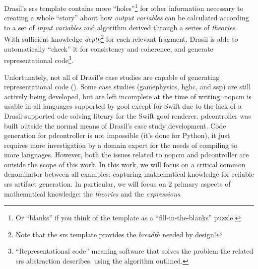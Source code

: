 Drasil's \acs{srs} template contains more ``holes''\footnote{Or ``blanks'' if you
      think of the template as a ``fill-in-the-blanks'' puzzle.} for other
information necessary to creating a whole ``story'' about how
\textit{output variables} can be calculated according to a set of
\textit{input variables} and algorithm derived through a series of
\textit{theories}. With sufficient knowledge \textit{depth}\footnote{Note
      that the \acs{srs} template provides the \textit{breadth} needed by
      design!} for each relevant fragment, Drasil is able to automatically
``check'' it for consistency and coherence, and generate representational
code\footnote{``Representational code'' meaning software that solves the
      problem the related \acs{srs} abstraction describes, using the algorithm
      outlined.}.

Unfortunately, not all of Drasil's case studies are capable of generating
representational code (). Some case studies
(\acs{gamephysics}, \acs{hghc}, and \acs{ssp}) are still actively being
developed, but are left incomplete at the time of writing. \acs{nopcm} is usable
in all languages supported by \acs{gool} except for Swift due to the lack of a
Drasil-supported \acs{ode} solving library for the Swift \acs{gool} renderer.
\acs{pdcontroller} was built \cite{DrasilPR2289Naveen} outside the normal means
of Drasil's case study development. Code generation for \acs{pdcontroller} is
not impossible (it's done for Python), it just requires more investigation by a
domain expert for the needs of compiling to more languages. However, both the
issues related to \acs{nopcm} and \acs{pdcontroller} are outside the scope of
this work. In this work, we will focus on a critical common denominator between
all examples: capturing mathematical knowledge for reliable \acs{srs} artifact
generation. In particular, we will focus on 2 primary aspects of mathematical
knowledge: the \textit{theories} and the \textit{expressions}.
